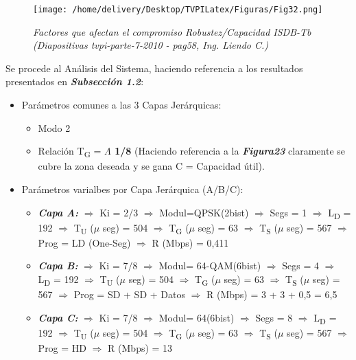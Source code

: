 \documentclass[a4paper,11pt]{article} %
\begin{document}
\begin{figure}[h!] 
\centering
\texttt{[image: /home/delivery/Desktop/TVPILatex/Figuras/Fig32.png]}
\caption{\emph{Factores que afectan el compromiso Robustez/Capacidad
ISDB-Tb (Diapositivas tvpi-parte-7-2010 - pag58, Ing. Liendo C.)}}
\end{figure}

\newpage
\begin{center}
\color{white}{.}
\end{center}
\newpage

Se procede al An\'alisis del Sistema, haciendo referencia a los
resultados presentados en \textbf{\emph{Subsecci\'on 1.2}}:

\begin{itemize}
\item Par\'ametros comunes a las 3 Capas Jer\'arquicas:
  \begin{itemize}
    \item Modo 2 
    \item Relaci\'on T\textsubscript{G} = \textbf{$\Lambda$ 1/8}
(Haciendo referencia a la \textbf{\emph{Figura23}}      claramente se
cubre la zona deseada y se gana C = Capacidad \'util).
  \end{itemize}
\item Par\'ametros varialbes por Capa Jer\'arquica (A/B/C):
    \begin{itemize}
     \item \textbf{\emph{Capa A:}}
	\subitem $\Rightarrow$ Ki = 2/3
	\subitem $\Rightarrow$ Modul=QPSK(2bist)
	\subitem $\Rightarrow$ Segs = 1
	\subitem $\Rightarrow$ L\textsubscript{D} = 192
	\subitem $\Rightarrow$ T\textsubscript{U} ($\mu$ seg) = 504
	\subitem $\Rightarrow$ T\textsubscript{G} ($\mu$ seg) = 63
	\subitem $\Rightarrow$ T\textsubscript{S} ($\mu$ seg) = 567
	\subitem $\Rightarrow$ Prog = LD (One-Seg)
	\subitem $\Rightarrow$ R (Mbps) = 0,411
    \item \textbf{\emph{Capa B:}}
	\subitem $\Rightarrow$ Ki = 7/8
	\subitem $\Rightarrow$ Modul= 64-QAM(6bist)
	\subitem $\Rightarrow$ Segs = 4
	\subitem $\Rightarrow$ L\textsubscript{D} = 192
	\subitem $\Rightarrow$ T\textsubscript{U} ($\mu$ seg) = 504
	\subitem $\Rightarrow$ T\textsubscript{G} ($\mu$ seg) = 63
	\subitem $\Rightarrow$ T\textsubscript{S} ($\mu$ seg) = 567
	\subitem $\Rightarrow$ Prog = SD + SD + Datos
	\subitem $\Rightarrow$ R (Mbps) = 3 + 3 + 0,5 = 6,5
    \item \textbf{\emph{Capa C:}}
	\subitem $\Rightarrow$ Ki = 7/8
	\subitem $\Rightarrow$ Modul= 64(6bist)
	\subitem $\Rightarrow$ Segs = 8
	\subitem $\Rightarrow$ L\textsubscript{D} = 192
	\subitem $\Rightarrow$ T\textsubscript{U} ($\mu$ seg) = 504
	\subitem $\Rightarrow$ T\textsubscript{G} ($\mu$ seg) = 63
	\subitem $\Rightarrow$ T\textsubscript{S} ($\mu$ seg) = 567
	\subitem $\Rightarrow$ Prog = HD
	\subitem $\Rightarrow$ R (Mbps) = 13
  \end{itemize}
\end{itemize}
\end{document}
